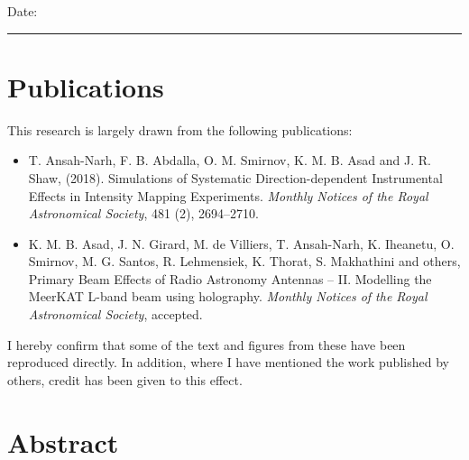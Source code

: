 \noindent Date:\\
\rule[0.5em]{25em}{0.5pt} %
\chapter*{Publications}
\vspace*{-2em}
This research is largely drawn from the following publications:

\begin{itemize}
 \item T. Ansah-Narh, F. B. Abdalla, O. M. Smirnov, K. M. B. Asad and J. R. Shaw, (2018). Simulations of Systematic Direction-dependent Instrumental Effects
in Intensity Mapping Experiments. \emph{Monthly Notices of the Royal Astronomical Society}, 481 (2), 2694--2710.

\item K. M. B. Asad, J. N. Girard, M. de Villiers, T. Ansah-Narh, K. Iheanetu, O. Smirnov, M. G. Santos, R. Lehmensiek,
K. Thorat, S. Makhathini and others, Primary Beam Effects of Radio Astronomy Antennas – II. Modelling the MeerKAT L-band beam using
holography. \emph{Monthly Notices of the Royal Astronomical Society}, accepted.
\end{itemize}

\noindent I hereby confirm that some of the text and figures from these have been reproduced directly. In addition, where I have mentioned the work published by others, credit has been given to this effect. 
\chapter*{Abstract} 
 \vspace*{-2em}
% 

